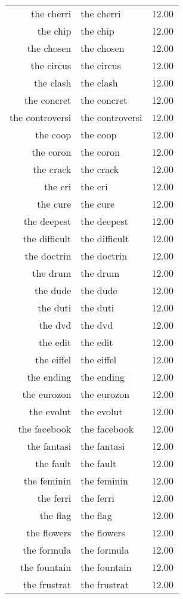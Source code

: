 \begin{table}[ht]
\begin{tabular}{rlr}
  the cherri & the cherri & 12.00 \\ 
  the chip & the chip & 12.00 \\ 
  the chosen & the chosen & 12.00 \\ 
  the circus & the circus & 12.00 \\ 
  the clash & the clash & 12.00 \\ 
  the concret & the concret & 12.00 \\ 
  the controversi & the controversi & 12.00 \\ 
  the coop & the coop & 12.00 \\ 
  the coron & the coron & 12.00 \\ 
  the crack & the crack & 12.00 \\ 
  the cri & the cri & 12.00 \\ 
  the cure & the cure & 12.00 \\ 
  the deepest & the deepest & 12.00 \\ 
  the difficult & the difficult & 12.00 \\ 
  the doctrin & the doctrin & 12.00 \\ 
  the drum & the drum & 12.00 \\ 
  the dude & the dude & 12.00 \\ 
  the duti & the duti & 12.00 \\ 
  the dvd & the dvd & 12.00 \\ 
  the edit & the edit & 12.00 \\ 
  the eiffel & the eiffel & 12.00 \\ 
  the ending & the ending & 12.00 \\ 
  the eurozon & the eurozon & 12.00 \\ 
  the evolut & the evolut & 12.00 \\ 
  the facebook & the facebook & 12.00 \\ 
  the fantasi & the fantasi & 12.00 \\ 
  the fault & the fault & 12.00 \\ 
  the feminin & the feminin & 12.00 \\ 
  the ferri & the ferri & 12.00 \\ 
  the flag & the flag & 12.00 \\ 
  the flowers & the flowers & 12.00 \\ 
  the formula & the formula & 12.00 \\ 
  the fountain & the fountain & 12.00 \\ 
  the frustrat & the frustrat & 12.00 \\ 

\end{tabular}
\end{table}

